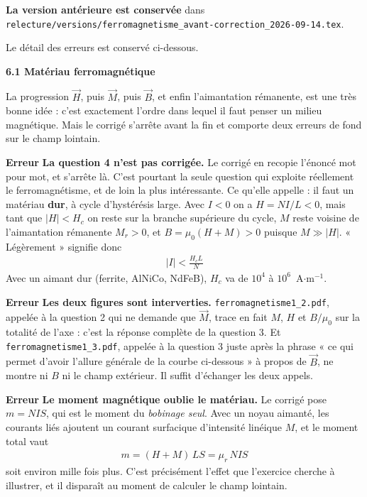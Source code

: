 \documentclass[a4paper,11pt]{article}
\newcommand{\exo}[1]{\vspace{0.7\baselineskip}\noindent\textbf{\large #1}\par\nopagebreak\vspace{0.2\baselineskip}}
\newcommand{\erreur}{\textcolor{BrickRed}{\textbf{Erreur}}}
\begin{document}
\medskip
\textbf{La version antérieure est conservée} dans
\texttt{relecture/versions/ferromagnetisme\_avant-correction\_2026-09-14.tex}.

\medskip
Le détail des erreurs est conservé ci-dessous.

\exo{6.1 Matériau ferromagnétique}

La progression $\vec H$, puis $\vec M$, puis $\vec B$, et enfin l'aimantation rémanente, est une très
bonne idée : c'est exactement l'ordre dans lequel il faut penser un milieu magnétique. Mais le corrigé
s'arrête avant la fin et comporte deux erreurs de fond sur le champ lointain.

\medskip
\erreur{} \textbf{La question 4 n'est pas corrigée.} Le corrigé en recopie l'énoncé mot pour mot, et
s'arrête là. C'est pourtant la seule question qui exploite réellement le ferromagnétisme, et de loin
la plus intéressante. Ce qu'elle appelle : il faut un matériau \textbf{dur}, à cycle d'hystérésis
large. Avec $I<0$ on a $H=NI/L<0$, mais tant que $|H|<H_c$ on reste sur la branche supérieure du
cycle, $M$ reste voisine de l'aimantation rémanente $M_r>0$, et $B=\mu_0(H+M)>0$ puisque
$M\gg|H|$. « Légèrement » signifie donc
\begin{align*}
	|I|<\frac{H_c L}{N}
\end{align*}
Avec un aimant dur (ferrite, AlNiCo, NdFeB), $H_c$ va de $10^{4}$ à $10^{6}$~A$\cdot$m$^{-1}$.

\medskip
\erreur{} \textbf{Les deux figures sont interverties.} \texttt{ferromagnetisme1\_2.pdf}, appelée à la
question 2 qui ne demande que $\vec M$, trace en fait $M$, $H$ et $B/\mu_0$ sur la totalité de l'axe :
c'est la réponse complète de la question 3. Et \texttt{ferromagnetisme1\_3.pdf}, appelée à la
question 3 juste après la phrase « ce qui permet d'avoir l'allure générale de la courbe ci-dessous »
à propos de $\vec B$, ne montre ni $B$ ni le champ extérieur. Il suffit d'échanger les deux appels.

\medskip
\erreur{} \textbf{Le moment magnétique oublie le matériau.} Le corrigé pose $m=NIS$, qui est le moment
du \textit{bobinage seul}. Avec un noyau aimanté, les courants liés ajoutent un courant surfacique
d'intensité linéique $M$, et le moment total vaut
\begin{align*}
	m=(H+M)\,LS=\mu_r\,NIS
\end{align*}
soit environ mille fois plus. C'est précisément l'effet que l'exercice cherche à illustrer, et il
disparaît au moment de calculer le champ lointain.
\end{document}
